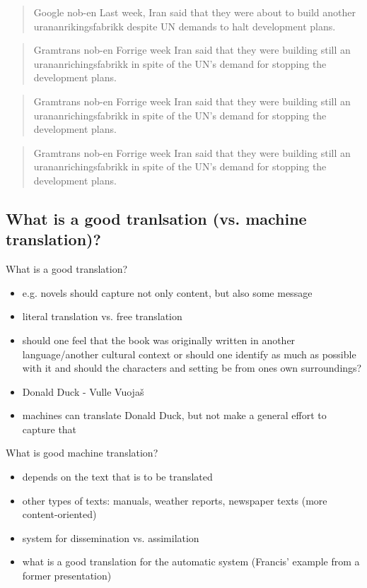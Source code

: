 \documentclass[a4paper,english,12pt]{article}
\begin{document}
\begin{spacing}{1.0}
\begin{quote}
Google nob-en
Last week, Iran said that they were about to build another urananrikingsfabrikk despite UN demands to halt development plans. 
\end{quote}

\begin{quote}
Gramtrans nob-en
Forrige week Iran said that they were building still an urananrichingsfabrikk in spite of the UN's demand for stopping the development plans.
\end{quote}


\begin{quote}
Gramtrans nob-en
Forrige week Iran said that they were building still an urananrichingsfabrikk in spite of the UN's demand for stopping the development plans.
\end{quote}


\begin{quote}
Gramtrans nob-en
Forrige week Iran said that they were building still an urananrichingsfabrikk in spite of the UN's demand for stopping the development plans.
\end{quote}

\subsection{What is a good tranlsation (vs. machine translation)?}

What is a good translation?
\begin{itemize}
\item e.g. novels should capture not only content, but also some message
\item literal translation vs. free translation
\item should one feel that the book was originally written in another language/another cultural context or should one identify as much as possible with it and should the characters and setting be from ones own surroundings?
\item Donald Duck - Vulle Vuojaš
\item machines can translate Donald Duck, but not make a general effort to capture that
\end{itemize}

What is good machine translation?
\begin{itemize}
\item depends on the text that is to be translated
\item other types of texts: manuals, weather reports, newspaper texts (more content-oriented)
\item system for dissemination vs. assimilation
\item what is a good translation for the automatic system (Francis' example from a former presentation)
\end{itemize}


\end{spacing}
\end{document}
